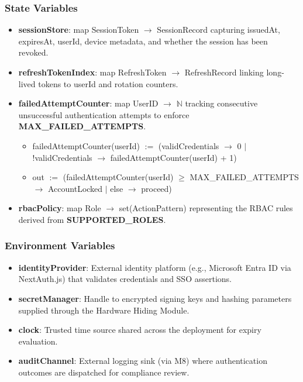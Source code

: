 \documentclass[12pt, titlepage]{article}
\begin{document}
\subsubsection{State Variables}

\begin{itemize}
  \item \textbf{sessionStore}: map SessionToken $\rightarrow$ SessionRecord capturing issuedAt, expiresAt, userId, device metadata, and whether the session has been revoked.
  \item \textbf{refreshTokenIndex}: map RefreshToken $\rightarrow$ RefreshRecord linking long-lived tokens to userId and rotation counters.
  \item \textbf{failedAttemptCounter}: map UserID $\rightarrow$ $\mathbb{N}$ tracking consecutive unsuccessful authentication attempts to enforce \textbf{MAX\_FAILED\_ATTEMPTS}.
    \begin{itemize}
      \item failedAttemptCounter(userId) $:=$ (validCredentials $\to$ 0 $\mid$ !validCredentials $\to$ failedAttemptCounter(userId) + 1)
      \item out $:=$ (failedAttemptCounter(userId) $\geq$ MAX\_FAILED\_ATTEMPTS $\to$ AccountLocked $\mid$ else $\to$ proceed)
    \end{itemize}
  \item \textbf{rbacPolicy}: map Role $\rightarrow$ set(ActionPattern) representing the RBAC rules derived from \textbf{SUPPORTED\_ROLES}.
\end{itemize}

\subsubsection{Environment Variables}

\begin{itemize}
  \item \textbf{identityProvider}: External identity platform (e.g., Microsoft Entra ID via NextAuth.js) that validates credentials and SSO assertions.
  \item \textbf{secretManager}: Handle to encrypted signing keys and hashing parameters supplied through the Hardware Hiding Module.
  \item \textbf{clock}: Trusted time source shared across the deployment for expiry evaluation.
  \item \textbf{auditChannel}: External logging sink (via M8) where authentication outcomes are dispatched for compliance review.
\end{itemize}
\end{document}
